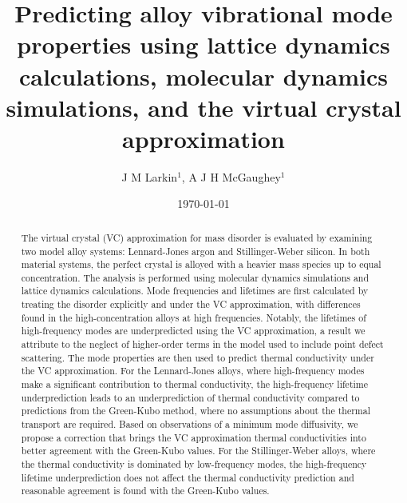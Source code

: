 \documentclass[12pt,twocolumn,iop]{/usr/share/texmf/tex/latex/iop/iopart}[/usr/share/texmf/tex/latex/iop/]
\begin{document}

\title{Predicting alloy vibrational mode properties using lattice
dynamics calculations, molecular dynamics simulations, and the virtual
crystal approximation}
\author{J M Larkin$^1$, A J H McGaughey$^1$ }
\address{$^1$ Department of Mechanical Engineering\\Carnegie Mellon University\\Pittsburgh, PA 15213}

\date{\today}


\begin{abstract}
The virtual crystal (VC) approximation for mass disorder is evaluated by
examining two model alloy systems: Lennard-Jones argon and Stillinger-Weber
silicon. 
In both material systems, the perfect crystal is alloyed with a heavier mass
species up to equal concentration.
The analysis is performed using molecular dynamics simulations and lattice
dynamics calculations.
Mode frequencies and lifetimes are first calculated by treating the disorder
explicitly and under the VC approximation, with differences found in the
high-concentration alloys at high frequencies. 
Notably, the lifetimes of high-frequency modes are underpredicted using the
VC approximation, a result we attribute to the neglect of higher-order terms 
in the model used to include point defect scattering.
The mode properties are then used to predict thermal conductivity under the
VC approximation.
For the Lennard-Jones alloys, where high-frequency modes make a significant
contribution to thermal conductivity, the high-frequency lifetime
underprediction leads to an underprediction of thermal conductivity compared
to predictions from the Green-Kubo method, where no assumptions about the
thermal transport are required.
Based on observations of a minimum mode diffusivity, we propose a correction
that brings the VC approximation thermal conductivities into better 
agreement with the Green-Kubo values. 
For the Stillinger-Weber alloys, where the thermal conductivity is dominated
by low-frequency modes, the high-frequency lifetime underprediction does not
affect the thermal conductivity prediction and reasonable agreement is found
with the Green-Kubo values. 
\end{abstract}
\end{document}
